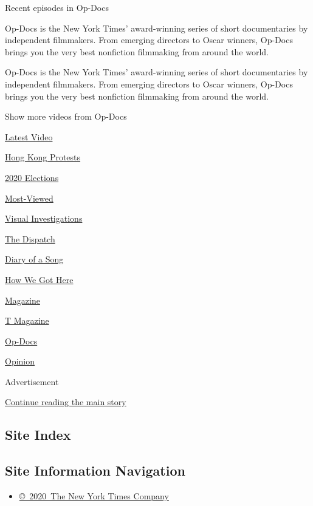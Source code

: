 Recent episodes in Op-Docs

Op-Docs is the New York Times' award-winning series of short
documentaries by independent filmmakers. From emerging directors to
Oscar winners, Op-Docs brings you the very best nonfiction filmmaking
from around the world.

Op-Docs is the New York Times' award-winning series of short
documentaries by independent filmmakers. From emerging directors to
Oscar winners, Op-Docs brings you the very best nonfiction filmmaking
from around the world.

Show more videos from Op-Docs

\href{/video}{}

\href{/video/latest-video}{Latest Video}

\href{/video/hk-protest}{Hong Kong Protests}

\href{/video/2020-Elections}{2020 Elections}

\href{/video/Most-Viewed}{Most-Viewed}

\href{/video/investigations}{Visual Investigations}

\href{/video/on-the-ground}{The Dispatch}

\href{/video/diaryofasong}{Diary of a Song}

\href{/video/how-we-got-here}{How We Got Here}

\href{/video/magazine}{Magazine}

\href{/video/t-magazine}{T Magazine}

\href{/video/op-docs}{Op-Docs}

\href{/video/opinion}{Opinion}

Advertisement

\protect\hyperlink{after-bottom}{Continue reading the main story}

\hypertarget{site-index}{%
\subsection{Site Index}\label{site-index}}

\hypertarget{site-information-navigation}{%
\subsection{Site Information
Navigation}\label{site-information-navigation}}

\begin{itemize}
\tightlist
\item
  \href{https://help.nytimes3xbfgragh.onion/hc/en-us/articles/115014792127-Copyright-notice}{©~2020~The
  New York Times Company}
\end{itemize}

